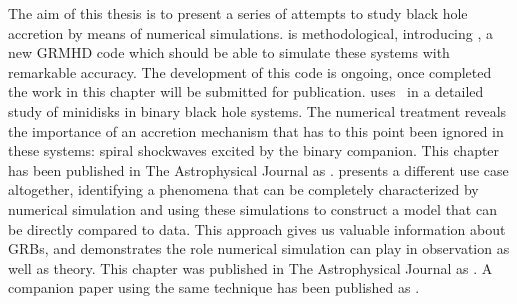 The aim of this thesis is to present a series of attempts to study black hole accretion by means of numerical simulations.   is methodological, introducing \grdisco, a new GRMHD code which should be able to simulate these systems with remarkable accuracy.  The development of this code is ongoing, once completed the work in this chapter will be submitted for publication.   uses \grdisco\ in a detailed study of minidisks in binary black hole systems.  The numerical treatment reveals the importance of an accretion mechanism that has to this point been ignored in these systems: spiral shockwaves excited by the binary companion.  This chapter has been published in The Astrophysical Journal as \cite{Ryan17}.   presents a different use case altogether, identifying a phenomena that can be completely characterized by numerical simulation and using these simulations to construct a model that can be directly compared to data.  This approach gives us valuable information about GRBs, and demonstrates the role numerical simulation can play in observation as well as theory.  This chapter was published in The Astrophysical Journal as \cite{Ryan15}.  A companion paper using the same technique has been published as \cite{Zhang15}.

